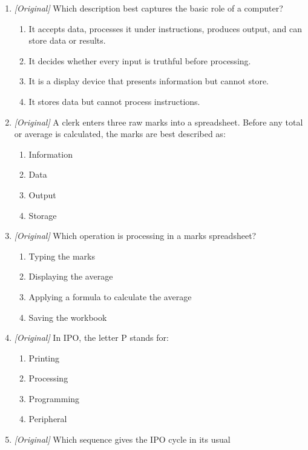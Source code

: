 \begin{enumerate}[label=\textbf{Q\arabic*.}, leftmargin=*]
\item \textit{[Original]} Which description best captures the basic role of
  a computer?
  \begin{enumerate}[label=\Alph*.]
    \item It accepts data, processes it under instructions, produces output,
      and can store data or results.
    \item It decides whether every input is truthful before processing.
    \item It is a display device that presents information but cannot store.
    \item It stores data but cannot process instructions.
  \end{enumerate}
\item \textit{[Original]} A clerk enters three raw marks into a spreadsheet.
  Before any total or average is calculated, the marks are best described as:
  \begin{enumerate}[label=\Alph*.]
    \item Information
    \item Data
    \item Output
    \item Storage
  \end{enumerate}
\item \textit{[Original]} Which operation is processing in a marks
  spreadsheet?
  \begin{enumerate}[label=\Alph*.]
    \item Typing the marks
    \item Displaying the average
    \item Applying a formula to calculate the average
    \item Saving the workbook
  \end{enumerate}
\item \textit{[Original]} In IPO, the letter P stands for:
  \begin{enumerate}[label=\Alph*.]
    \item Printing
    \item Processing
    \item Programming
    \item Peripheral
  \end{enumerate}
\item \textit{[Original]} Which sequence gives the IPO cycle in its usual

\end{enumerate}
